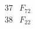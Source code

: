 \documentclass{article}
\begin{document}
{$$\begin{array}{|r|*{7}{r|}}
 & 
 & 
 & 
 & 
\\
\hline
37 
 &  F_{72}&
 & 
 & 
 & 
 & 
 & 
\\
\hline
38 
 &F_{22}  &
 & 
 & 
 & 
 & 
 & 

\end{array}$$}
\end{document}

